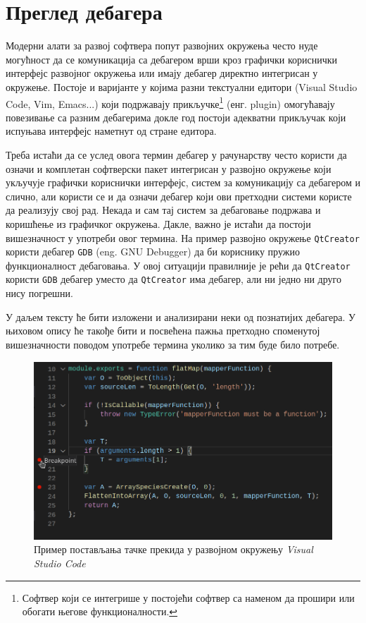 \documentclass[a4paper]{article}
\begin{document}
\section{Преглед дебагера}
\label{sec:debuggerOverview}

Модерни алати за развој софтвера попут развојних окружења често нуде
могућност да се комуникација са дебагером врши кроз графички кориснички
интерфејс развојног окружења или имају дебагер директно интегрисан у
окружење. Постоје и варијанте у којима разни текстуални едитори
(Visual Studio Code, Vim, Emacs...) који подржавају прикључке\footnote{Софтвер који се интегрише у постојећи
софтвер са наменом да прошири или обогати његове функционалности.} (енг. plugin) 
омогућавају повезивање са разним дебагерима докле год постоји адекватни
прикључак који испуњава интерфејс наметнут од стране едитора.

Треба истаћи да се услед овога термин дебагер у рачунарству често користи да означи
и комплетан софтверски пакет интегрисан у развојно окружење
који укључује графички кориснички интерфејс, систем за комуникацију са дебагером 
и слично, али користи се и да означи дебагер који ови претходни системи
користе да реализују свој рад. Некада и сам тај систем за дебаговање
подржава и коришћење из графичког окружења. Дакле, важно
је истаћи да постоји вишезначност у употреби овог термина. На пример развојно окружење
\texttt{QtCreator} користи дебагер \texttt{GDB} (eng. GNU Debugger)
да би кориснику пружио функционалност дебаговања.
У овој ситуацији правилније је рећи да \texttt{QtCreator} користи
\texttt{GDB} дебагер уместо да \texttt{QtCreator} има дебагер, али ни једно ни друго
нису погрешни.

У даљем тексту ће бити изложени и анализирани неки од познатијих дебагера.
У њиховом опису ће такође бити и посвећена пажња претходно споменутој
вишезначности поводом употребе термина уколико за тим буде било потребе.

\begin{figure}
    \begin{center}
        \includegraphics[scale=0.5]{slike/tacke_prekida_vscode.png}
    \end{center}
    \caption{Пример постављања тачке прекида у развојном окружењу
        {\em Visual Studio Code}}
    \label{fig:breakpoints}
\end{figure}
\end{document}
